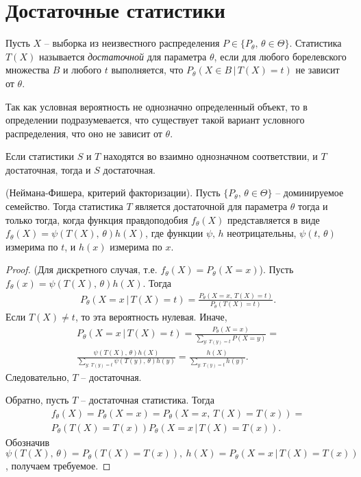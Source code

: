 \section{Достаточные статистики}
\begin{definition}
    Пусть $X$ -- выборка из неизвестного распределения $P \in \{P_\theta,\, \theta \in \Theta\}$. Статистика $T(X)$ называется \textit{достаточной} для параметра $\theta$, если для любого борелевского множества $B$ и любого $t$ выполняется, что $P_\theta(X \in B\, \vert\, T(X) = t)$ не зависит от $\theta$.
\end{definition}
\begin{note}
    Так как условная вероятность не однозначно определенный объект, то в определении подразумевается, что существует такой вариант условного распределения, что оно не зависит от $\theta$.
\end{note}
\begin{note}
    Если статистики $S$ и $T$ находятся во взаимно однозначном соответствии, и $T$ достаточная, тогда и $S$ достаточная.
\end{note}
\begin{theorem} 
    (Неймана-Фишера, критерий факторизации). Пусть $\{P_\theta,\, \theta \in \Theta\}$ -- доминируемое семейство. Тогда статистика $T$ является достаточной для параметра $\theta$ тогда и только тогда, когда функция правдоподобия $f_\theta(X)$ представляется в виде $f_\theta(X) = \psi(T(X),\, \theta)h(X)$, где функции $\psi,\, h$ неотрицательны, $\psi(t,\, \theta)$ измерима по $t$, и $h(x)$ измерима по $x$.
\end{theorem}
\begin{proof}
    (Для дискретного случая, т.е. $f_\theta(X) = P_\theta(X = x)$). Пусть $f_\theta(x) = \psi(T(X),\, \theta)h(X)$. Тогда 
    \begin{gather*}
        P_\theta(X = x\, \vert\, T(X) = t) = \frac{P_\theta(X = x,\, T(X) = t)}{P_\theta(T(X) = t)}.
    \end{gather*}
    Если $T(X) \ne t$, то эта вероятность нулевая. Иначе,
    \begin{gather*}
        P_\theta(X = x\, \vert\, T(X) = t) = \frac{P_\theta (X = x)}{\sum_{y:\, T(y) = t}P(X = y)} =\\ \frac{\psi(T(X),\, \theta)h(X)}{\sum_{y:\, T(y) = t}\psi(T(y),\, \theta)h(y)} = \frac{h(X)}{\sum_{y:\, T(y) = t}h(y)}.
    \end{gather*}
    Следовательно, $T$ -- достаточная.
    
    Обратно, пусть $T$ -- достаточная статистика. Тогда
    \begin{gather*}
        f_\theta(X)=P_\theta(X = x) = P_\theta(X = x,\, T(X) = T(x)) =\\ P_\theta(T(X) = T(x))P_\theta(X = x\, \vert\, T(X) = T(x)).
    \end{gather*}
    Обозначив $\psi(T(X),\, \theta) = P_\theta(T(X) = T(x)),\ h(X) = P_\theta(X = x\, \vert\, T(X) = T(x))$, получаем требуемое.
\end{proof}

